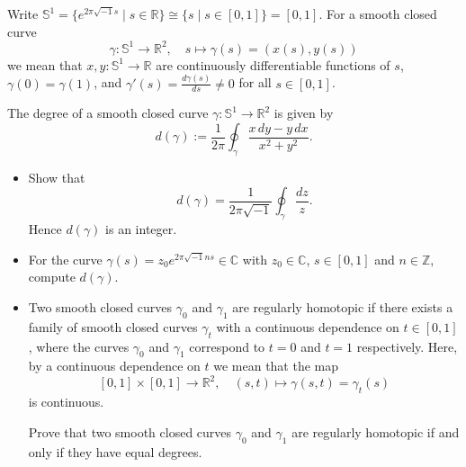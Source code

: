 \begin{exercise}
\label{analysis:2025:4}
Write $\mathbb{S}^1 = \{e^{2\pi\sqrt{-1}s}\mid s\in\mathbb{R}\}\cong\{s\mid s\in[0,1]\} = [0,1]$. For a smooth closed curve
\[
\gamma:\mathbb{S}^1\longrightarrow\mathbb{R}^2,\quad s\longmapsto\gamma(s) = (x(s),y(s))
\]
we mean that $x,y:\mathbb{S}^1\to\mathbb{R}$ are continuously differentiable functions of $s$, $\gamma(0)=\gamma(1)$, and $\gamma'(s) = \frac{d\gamma(s)}{ds}\neq 0$ for all $s\in[0,1]$.

The degree of a smooth closed curve $\gamma:\mathbb{S}^1\to\mathbb{R}^2$ is given by
\[
d(\gamma) := \frac{1}{2\pi}\oint_{\gamma}\frac{x\,dy - y\,dx}{x^2+y^2}.
\]

\begin{itemize}
\item[(1)] Show that
\[
d(\gamma) = \frac{1}{2\pi\sqrt{-1}}\oint_{\gamma}\frac{dz}{z}.
\]
Hence $d(\gamma)$ is an integer.

\item[(2)] For the curve $\gamma(s) = z_0 e^{2\pi\sqrt{-1}ns}\in\mathbb{C}$ with $z_0\in\mathbb{C}$, $s\in[0,1]$ and $n\in\mathbb{Z}$, compute $d(\gamma)$.

\item[(3)] Two smooth closed curves $\gamma_0$ and $\gamma_1$ are regularly homotopic if there exists a family of smooth closed curves $\gamma_t$ with a continuous dependence on $t\in[0,1]$, where the curves $\gamma_0$ and $\gamma_1$ correspond to $t=0$ and $t=1$ respectively. Here, by a continuous dependence on $t$ we mean that the map
\[
[0,1]\times[0,1]\longrightarrow\mathbb{R}^2,\quad (s,t)\longmapsto\gamma(s,t)=\gamma_t(s)
\]
is continuous.

Prove that two smooth closed curves $\gamma_0$ and $\gamma_1$ are regularly homotopic if and only if they have equal degrees.
\end{itemize}
\end{exercise}

